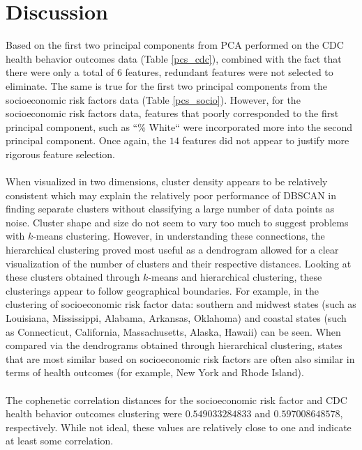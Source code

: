 \documentclass{article}
\begin{document}
\section{Discussion}
\label{Discussion}
Based on the first two principal components from PCA performed on the CDC health behavior outcomes data (Table \ref{pcs_cdc}), combined with the fact that there were only a total of 6 features, redundant features were not selected to eliminate. The same is true for the first two principal components from the socioeconomic risk factors data (Table \ref{pcs_socio}). However, for the socioeconomic risk factors data, features that poorly corresponded to the first principal component, such as ``\% White`` were incorporated more into the second principal component. Once again, the $14$ features did not appear to justify more rigorous feature selection. 
\\\\
When visualized in two dimensions, cluster density appears to be relatively consistent which may explain the relatively poor performance of DBSCAN in finding separate clusters without classifying a large number of data points as noise. Cluster shape and size do not seem to vary too much to suggest problems with $k$-means clustering. However, in understanding these connections, the hierarchical clustering proved most useful as a dendrogram allowed for a clear visualization of the number of clusters and their respective distances. Looking at these clusters obtained through $k$-means and hierarchical clustering, these clusterings appear to follow geographical boundaries. For example, in the clustering of socioeconomic risk factor data: southern and midwest states (such as Louisiana, Mississippi, Alabama, Arkansas, Oklahoma) and coastal states (such as Connecticut, California, Massachusetts, Alaska, Hawaii) can be seen. When compared via the dendrograms obtained through hierarchical clustering, states that are most similar based on socioeconomic risk factors are often also similar in terms of health outcomes (for example, New York and Rhode Island). 
\\\\
The cophenetic correlation distances for the socioeconomic risk factor and CDC health behavior outcomes clustering were $0.549033284833$ and $0.597008648578$, respectively. While not ideal, these values are relatively close to one and indicate at least some correlation.
\\\\
\end{document}
